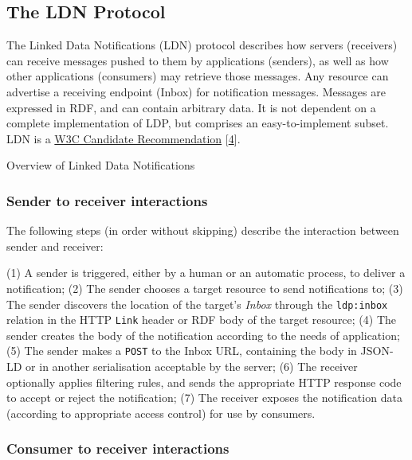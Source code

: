 \documentclass[]{article}
\begin{document}
\hypertarget{protocol}{}
\subsection{The LDN Protocol}\label{the-ldn-protocol}

The Linked Data Notifications (LDN) protocol describes how servers
(receivers) can receive messages pushed to them by applications
(senders), as well as how other applications (consumers) may retrieve
those messages. Any resource can advertise a receiving endpoint (Inbox)
for notification messages. Messages are expressed in RDF, and can
contain arbitrary data. It is not dependent on a complete implementation
of LDP, but comprises an easy-to-implement subset. LDN is a
\href{https://www.w3.org/TR/ldn}{W3C Candidate Recommendation}
{[}\protect\hyperlink{ref-4}{4}{]}.

Overview of Linked Data Notifications

\hypertarget{sender-to-receiver}{}
\subsubsection{Sender to receiver
interactions}\label{sender-to-receiver-interactions}

The following steps (in order without skipping) describe the interaction
between sender and receiver:

(1) A sender is triggered, either by a human or an automatic process, to
deliver a notification; (2) The sender chooses a target resource to send
notifications to; (3) The sender discovers the location of the target's
\emph{Inbox} through the \texttt{ldp:inbox} relation in the HTTP
\texttt{Link} header or RDF body of the target resource; (4) The sender
creates the body of the notification according to the needs of
application; (5) The sender makes a \texttt{POST} to the Inbox URL,
containing the body in JSON-LD or in another serialisation acceptable by
the server; (6) The receiver optionally applies filtering rules, and
sends the appropriate HTTP response code to accept or reject the
notification; (7) The receiver exposes the notification data (according
to appropriate access control) for use by consumers.

\hypertarget{consumer-to-receiver}{}
\subsubsection{Consumer to receiver
interactions}\label{consumer-to-receiver-interactions}
\end{document}
